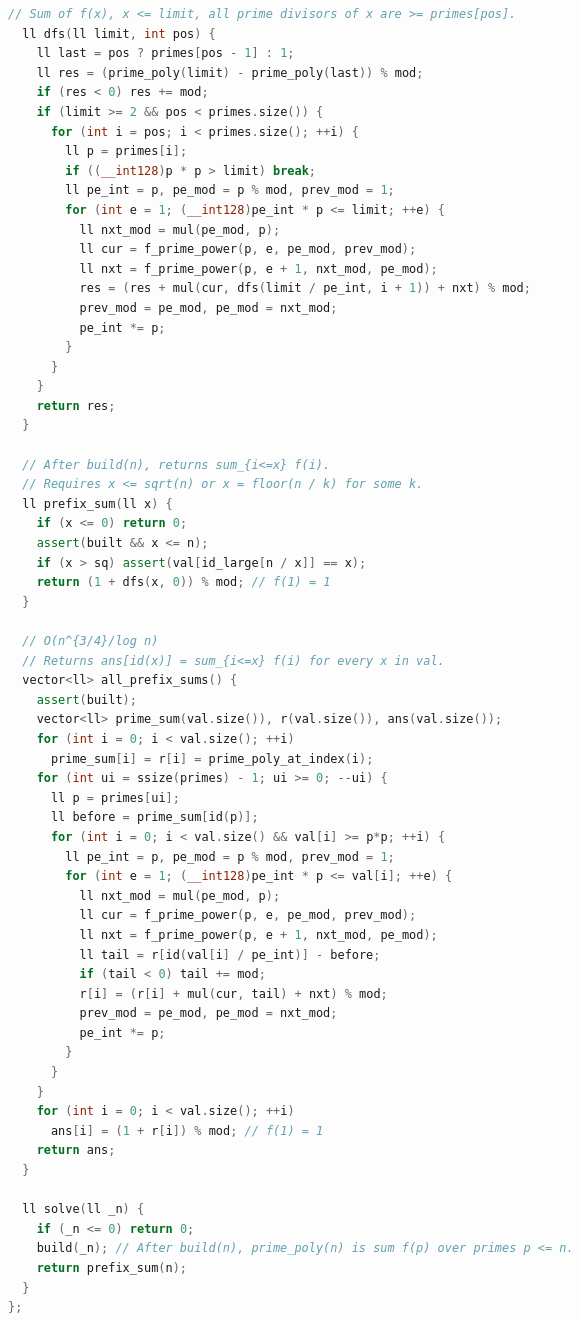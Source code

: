 \documentclass[8pt,a4paper,landscape,twosided]{extarticle}
\begin{document}
\begin{multicols*}{3}
\begin{lstlisting}[language=C++]
  // Sum of f(x), x <= limit, all prime divisors of x are >= primes[pos].
  ll dfs(ll limit, int pos) {
    ll last = pos ? primes[pos - 1] : 1;
    ll res = (prime_poly(limit) - prime_poly(last)) % mod;
    if (res < 0) res += mod;
    if (limit >= 2 && pos < primes.size()) {
      for (int i = pos; i < primes.size(); ++i) {
        ll p = primes[i];
        if ((__int128)p * p > limit) break;
        ll pe_int = p, pe_mod = p % mod, prev_mod = 1;
        for (int e = 1; (__int128)pe_int * p <= limit; ++e) {
          ll nxt_mod = mul(pe_mod, p);
          ll cur = f_prime_power(p, e, pe_mod, prev_mod);
          ll nxt = f_prime_power(p, e + 1, nxt_mod, pe_mod);
          res = (res + mul(cur, dfs(limit / pe_int, i + 1)) + nxt) % mod;
          prev_mod = pe_mod, pe_mod = nxt_mod;
          pe_int *= p;
        }
      }
    }
    return res;
  }

  // After build(n), returns sum_{i<=x} f(i).
  // Requires x <= sqrt(n) or x = floor(n / k) for some k.
  ll prefix_sum(ll x) {
    if (x <= 0) return 0;
    assert(built && x <= n);
    if (x > sq) assert(val[id_large[n / x]] == x);
    return (1 + dfs(x, 0)) % mod; // f(1) = 1
  }

  // O(n^{3/4}/log n)
  // Returns ans[id(x)] = sum_{i<=x} f(i) for every x in val.
  vector<ll> all_prefix_sums() {
    assert(built);
    vector<ll> prime_sum(val.size()), r(val.size()), ans(val.size());
    for (int i = 0; i < val.size(); ++i)
      prime_sum[i] = r[i] = prime_poly_at_index(i);
    for (int ui = ssize(primes) - 1; ui >= 0; --ui) {
      ll p = primes[ui];
      ll before = prime_sum[id(p)];
      for (int i = 0; i < val.size() && val[i] >= p*p; ++i) {
        ll pe_int = p, pe_mod = p % mod, prev_mod = 1;
        for (int e = 1; (__int128)pe_int * p <= val[i]; ++e) {
          ll nxt_mod = mul(pe_mod, p);
          ll cur = f_prime_power(p, e, pe_mod, prev_mod);
          ll nxt = f_prime_power(p, e + 1, nxt_mod, pe_mod);
          ll tail = r[id(val[i] / pe_int)] - before;
          if (tail < 0) tail += mod;
          r[i] = (r[i] + mul(cur, tail) + nxt) % mod;
          prev_mod = pe_mod, pe_mod = nxt_mod;
          pe_int *= p;
        }
      }
    }
    for (int i = 0; i < val.size(); ++i)
      ans[i] = (1 + r[i]) % mod; // f(1) = 1
    return ans;
  }

  ll solve(ll _n) {
    if (_n <= 0) return 0;
    build(_n); // After build(n), prime_poly(n) is sum f(p) over primes p <= n.
    return prefix_sum(n);
  }
};
\end{lstlisting}


\end{multicols*}
\end{document}
